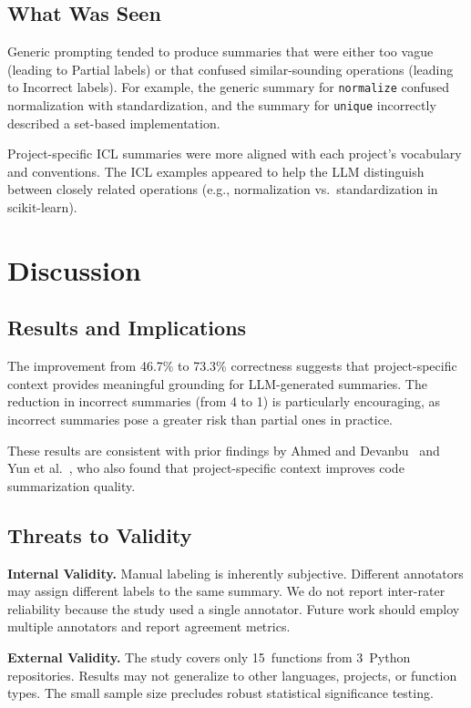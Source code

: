\documentclass[conference]{IEEEtran}
\begin{document}
\subsection{What Was Seen}
Generic prompting tended to produce summaries that were either too vague
(leading to Partial labels) or that confused similar-sounding operations
(leading to Incorrect labels). For example, the generic summary for
\texttt{normalize} confused normalization with standardization, and the summary
for \texttt{unique} incorrectly described a set-based implementation.

Project-specific ICL summaries were more aligned with each project's vocabulary
and conventions. The ICL examples appeared to help the LLM distinguish between
closely related operations (e.g., normalization vs.\ standardization in
scikit-learn).

\section{Discussion}
\label{sec:discussion}

\subsection{Results and Implications}
The improvement from 46.7\% to 73.3\% correctness suggests that project-specific
context provides meaningful grounding for LLM-generated summaries. The reduction
in incorrect summaries (from 4 to 1) is particularly encouraging, as incorrect
summaries pose a greater risk than partial ones in practice.

These results are consistent with prior findings by Ahmed and
Devanbu~\cite{ahmed2022fewshot} and Yun et al.~\cite{yun2024pcodesum}, who
also found that project-specific context improves code summarization quality.

\subsection{Threats to Validity}
\label{sec:validity}

\textbf{Internal Validity.}
Manual labeling is inherently subjective. Different annotators may assign
different labels to the same summary. We do not report inter-rater reliability
because the study used a single annotator. Future work should employ multiple
annotators and report agreement metrics.

\textbf{External Validity.}
The study covers only 15~functions from 3~Python repositories. Results may not
generalize to other languages, projects, or function types. The small sample
size precludes robust statistical significance testing.
\end{document}
